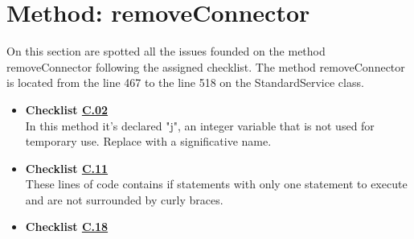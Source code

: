 \documentclass[../../../../codeInspection.tex]{subfiles}
\begin{document}
	\section{Method: removeConnector}

		On this section are spotted all the issues founded on the method removeConnector following the assigned checklist.
		The method removeConnector is located from the line 467 to the line 518 on the StandardService class.

		\begin{itemize}

			\item \textbf{Checklist \hyperref[C:02]{C.02}} \\

				  In this method it's declared "j", an integer variable that is not used for temporary use. Replace with a significative name.

			\item \textbf{Checklist \hyperref[C:11]{C.11}} \\

				  

				  

				  These lines of code contains if statements with only one statement to execute and are not surrounded by curly braces.

		    \item \textbf{Checklist \hyperref[C:18]{C.18}} \\

		    	  

		    	  

		    	  

		    	  

		    	  

		    	  


\end{itemize}
\end{document}
